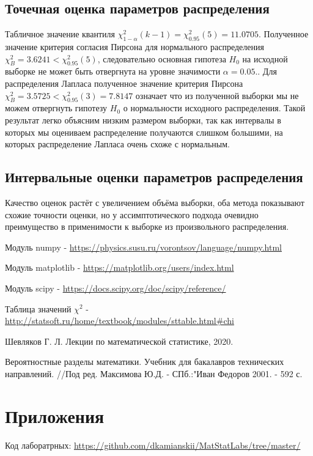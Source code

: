 \documentclass[a4]{article}
\begin{document}
\subsection{Точечная оценка параметров распределения}
Табличное значение квантиля  $\chi^2_{1-\alpha}(k-1)=\chi^2_{0.95}(5) = 11.0705$.
Полученное значение критерия согласия Пирсона для нормального распределения $\chi_B^2 = 3.6241 < \chi^2_{0.95}(5)$, следовательно основная гипотеза $H_0$ на исходной выборке не может быть отвергнута на уровне значимости $\alpha = 0.05.$. Для распределения Лапласа полученное значение критерия Пирсона $\chi_B^2 = 3.5725 < \chi^2_{0.95}(3) = 7.8147$ означает что из полученной выборки мы не можем отвергнуть гипотезу $H_0$ о нормальности исходного распределения. Такой результат легко объясним низким размером выборки, так как интервалы в которых мы оцениваем распределение получаются слишком большими, на которых распределение Лапласа очень схоже с нормальным.

\subsection{Интервальные оценки параметров распределения}

Качество оценок растёт с увеличением объёма выборки, оба метода показывают схожие точности оценки, но у ассимптотического подхода очевидно преимущество в применимости к выборке из произвольного распределения.

\begin{thebibliography}{}
      Модуль numpy  -  \url{https://physics.susu.ru/vorontsov/language/numpy.html}
   
   Модуль matplotlib - \url{https://matplotlib.org/users/index.html}
   
   Модуль scipy - \url{https://docs.scipy.org/doc/scipy/reference/}
    
    Таблица значений $\chi^2$ - \url{http://statsoft.ru/home/textbook/modules/sttable.html#chi}
    

Шевляков Г. Л. Лекции по математической статистике, 2020.

Вероятностные разделы математики. Учебник для бакалавров технических направлений. //Под ред. Максимова Ю.Д. - СПб.:"Иван Федоров 2001. - 592 с.
    

\end{thebibliography}

\section{Приложения}



Код лаборатрных:\; \url{https://github.com/dkamianskii/MatStatLabs/tree/master/}

%
\end{document}
